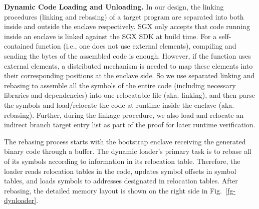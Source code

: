 {\vspace{3pt}\noindent\textbf{Dynamic Code Loading and Unloading.} \label{subsec-dynamicloader}
In our design, the linking procedures (linking and rebasing) of a target program are separated into both inside and outside the enclave respectively. SGX only accepts that code running inside an enclave is linked against the SGX SDK at build time. For a self-contained function (i.e., one does not use external elements), compiling and sending the bytes of the assembled code is enough. However, if the function uses external elements, a distributed mechanism is needed to map these elements into their corresponding positions at the enclave side. So we use separated linking and rebasing to assemble all the symbols of the entire code (including necessary libraries and dependencies) into one relocatable file (aka. linking), and then parse the symbols and load/relocate the code at runtime inside the enclave (aka. rebasing). Further, during the linkage procedure, we also load and relocate an indirect branch target entry list as part of the proof for later runtime verification.

The rebasing process starts with the bootstrap enclave receiving the generated binary code through a buffer. The dynamic loader's primary task is to rebase all of its symbols according to information in its relocation table. Therefore, the loader reads relocation tables in the code, updates symbol offsets in symbol tables, and loads symbols to addresses designated in relocation tables. After rebasing, the detailed memory layout is shown on the right side in Fig.~\ref{fg-dynloader}.




}
